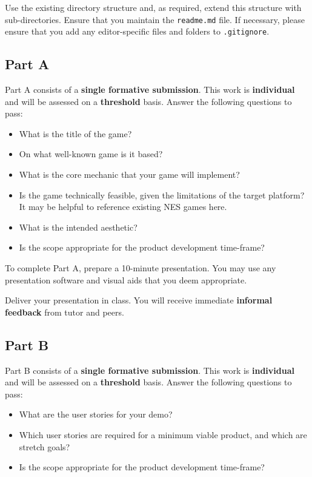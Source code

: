 \documentclass{../../fal_assignment}
\begin{document}
Use the existing directory structure and, as required, extend this structure with sub-directories.
Ensure that you maintain the \texttt{readme.md} file.
If necessary, please ensure that you add any editor-specific files and folders to \texttt{.gitignore}. 

\subsection*{Part A}

Part A consists of a \textbf{single formative submission}. This work is \textbf{individual} and will be assessed on a \textbf{threshold} basis. Answer the following questions to pass:

\begin{itemize}
	\item What is the title of the game?
	\item On what well-known game is it based?
	\item What is the core mechanic that your game will implement?
	\item Is the game technically feasible, given the limitations of the target platform?
		It may be helpful to reference existing NES games here.
	\item What is the intended aesthetic?
	\item Is the scope appropriate for the product development time-frame?
\end{itemize}

To complete Part A, prepare a 10-minute presentation.
You may use any presentation software and visual aids that you deem appropriate.

Deliver your presentation in class. You will receive immediate \textbf{informal feedback}
from tutor and peers.

\subsection*{Part B}

Part B consists of a \textbf{single formative submission}. This work is \textbf{individual} and will be assessed on a \textbf{threshold} basis. Answer the following questions to pass:

\begin{itemize}
	\item What are the user stories for your demo?
	\item Which user stories are required for a minimum viable product, and which are stretch goals?
	\item Is the scope appropriate for the product development time-frame?
\end{itemize}
\end{document}

